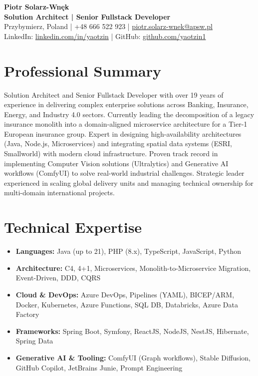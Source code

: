 \documentclass[11pt,a4paper]{article}
\begin{document}
	
	\begin{center}
		{\LARGE \textbf{Piotr Solarz-Wnęk}} \\ \vspace{4pt}
		\textbf{Solution Architect | Senior Fullstack Developer} \\ \vspace{4pt}
		Przybymierz, Poland | +48 666 522 923 | \href{mailto:piotr.solarz-wnek@apsw.pl}{piotr.solarz-wnek@apsw.pl} \\
		LinkedIn: \href{https://linkedin.com/in/yaotzin}{linkedin.com/in/yaotzin} | GitHub: \href{https://github.com/yaotzin1}{github.com/yaotzin1}
	\end{center}
	
	\section{Professional Summary}
	Solution Architect and Senior Fullstack Developer with over 19 years of experience in delivering complex enterprise solutions across Banking, Insurance, Energy, and Industry 4.0 sectors. Currently leading the decomposition of a legacy insurance monolith into a domain-aligned microservice architecture for a Tier-1 European insurance group. Expert in designing high-availability architectures (Java, Node.js, Microservices) and integrating spatial data systems (ESRI, Smallworld) with modern cloud infrastructure. Proven track record in implementing Computer Vision solutions (Ultralytics) and Generative AI workflows (ComfyUI) to solve real-world industrial challenges. Strategic leader experienced in scaling global delivery units and managing technical ownership for multi-domain international projects.
	
	\section{Technical Expertise}
	\begin{itemize}[leftmargin=*, noitemsep, topsep=0pt]
		\item \textbf{Languages:} Java (up to 21), PHP (8.x), TypeScript, JavaScript, Python
		\item \textbf{Architecture:} C4, 4+1, Microservices, Monolith-to-Microservice Migration, Event-Driven, DDD, CQRS
		\item \textbf{Cloud \& DevOps:} Azure DevOps, Pipelines (YAML), BICEP/ARM, Docker, Kubernetes, Azure Functions, SQL DB, Databricks, Azure Data Factory
		\item \textbf{Frameworks:} Spring Boot, Symfony, ReactJS, NodeJS, NestJS, Hibernate, Spring Data
		\item \textbf{Generative AI \& Tooling:} ComfyUI (Graph workflows), Stable Diffusion, GitHub Copilot, JetBrains Junie, Prompt Engineering
	\end{itemize}
	
\end{document}
